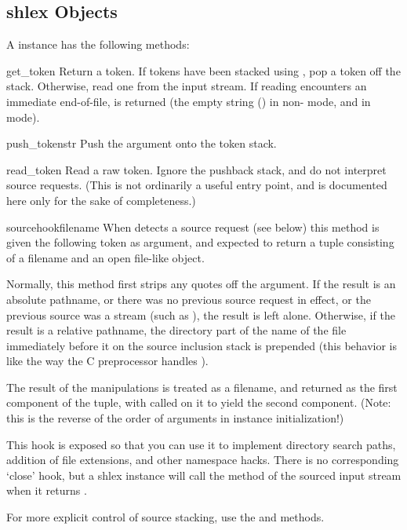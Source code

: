 \begin{seealso}
\end{seealso}


\subsection{shlex Objects \label{shlex-objects}}

A  instance has the following methods:

\begin{methoddesc}{get_token}{}
Return a token.  If tokens have been stacked using
, pop a token off the stack.  Otherwise, read one
from the input stream.  If reading encounters an immediate
end-of-file,  is returned (the empty string ()
in non-\POSIX{} mode, and  in \POSIX{} mode).
\end{methoddesc}

\begin{methoddesc}{push_token}{str}
Push the argument onto the token stack.
\end{methoddesc}

\begin{methoddesc}{read_token}{}
Read a raw token.  Ignore the pushback stack, and do not interpret source
requests.  (This is not ordinarily a useful entry point, and is
documented here only for the sake of completeness.)
\end{methoddesc}

\begin{methoddesc}{sourcehook}{filename}
When  detects a source request (see
 below) this method is given the following token as
argument, and expected to return a tuple consisting of a filename and
an open file-like object.

Normally, this method first strips any quotes off the argument.  If
the result is an absolute pathname, or there was no previous source
request in effect, or the previous source was a stream
(such as ), the result is left alone.  Otherwise, if the
result is a relative pathname, the directory part of the name of the
file immediately before it on the source inclusion stack is prepended
(this behavior is like the way the C preprocessor handles
).

The result of the manipulations is treated as a filename, and returned
as the first component of the tuple, with
 called on it to yield the second component. (Note:
this is the reverse of the order of arguments in instance initialization!)

This hook is exposed so that you can use it to implement directory
search paths, addition of file extensions, and other namespace hacks.
There is no corresponding `close' hook, but a shlex instance will call
the  method of the sourced input stream when it
returns \EOF.

For more explicit control of source stacking, use the
 and  methods. 
\end{methoddesc}

